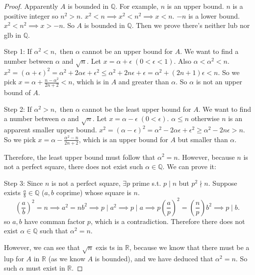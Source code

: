 \documentclass[12pt]{article}
\newcommand{\bbQ}{\mathbb{Q}}
\newcommand{\bbR}{\mathbb{R}}
\theoremstyle{definition}
\numberwithin{equation}{subsection}
\begin{document}
\begin{proof}
Apparently $A$ is bounded in $\bbQ$. For example, $n$ is an upper bound. $n$ is a positive integer so $n^2 > n$. $x^2 < n \implies x^2 < n^2 \implies x < n$. $-n$ is a lower bound. $x^2 < n^2 \implies x > -n$. So $A$ is bounded in $\bbQ$. Then we prove there's neither lub nor glb in $\bbQ$. 

Step 1: If $\alpha^{2}<n,$ then $\alpha$ cannot be an upper bound for $A$. We want to find a number between $\alpha$ and $\sqrt{n}$. Let $x=\alpha+\epsilon \;(0 < \epsilon < 1)$. Also $\alpha < \alpha^2 < n$. $x^{2}=(\alpha+\epsilon)^{2}=\alpha^{2}+2 \alpha \epsilon+\epsilon^{2} \leq \alpha^{2}+2n\epsilon+\epsilon = \alpha^{2}+(2n+1)\epsilon < n$. So we pick $x= \alpha + \frac{n-\alpha^2}{2n+2} < n$, which is in $A$ and greater than $\alpha$. So $\alpha$ is not an upper bound of $A$. 

Step 2: If $\alpha^{2}>n,$ then $\alpha$ cannot be the least upper bound for $A$. We want to find a number between $\alpha$ and $\sqrt{n}$. Let $x=\alpha-\epsilon \;(0< \epsilon)$. $\alpha \leq n$ otherwise $n$ is an apparent smaller upper bound. 
$x^{2}=(\alpha-\epsilon)^{2}=\alpha^{2}-2 \alpha \epsilon+\epsilon^{2} \geq \alpha^{2}-2n\epsilon > n$. So we pick $x= \alpha - \frac{\alpha^2-n}{2n+2}$, which is an upper bound for $A$ but smaller than $\alpha$. 

Therefore, the least upper bound must follow that $\alpha^2 = n$. However, because $n$ is not a perfect square, there does not exist such $\alpha \in \bbQ$. We can prove it:

Step 3: Since $n$ is not a perfect square, $\exists p$ prime s.t. $p\mid n$ but $p^2\nmid n$. Suppose exists $\frac{a}{b} \in \bbQ$ ($a, b$ coprime) whose square is $n$. 
$$
\left(\frac{a}{b}\right)^2 = n \implies a^2 = nb^2 \implies p \mid a^2 \implies p \mid a \implies p\left(\frac{a}{p}\right)^2 = \left(\frac{n}{p}\right)b^2 \implies p\mid b.
$$
so $a, b$ have comman factor $p$, which is a contradiction. Therefore there does not exist $\alpha \in \bbQ$ such that $\alpha^2 = n$. 

However, we can see that $\sqrt{n}$ exis
ts in $\bbR$, because we know that there must be a lup for $A$ in $\bbR$ (as we know $A$ is bounded), and we have deduced that $\alpha^2 = n$. So such $\alpha$ must exist in $\bbR$. 
\end{proof}

\end{document}
